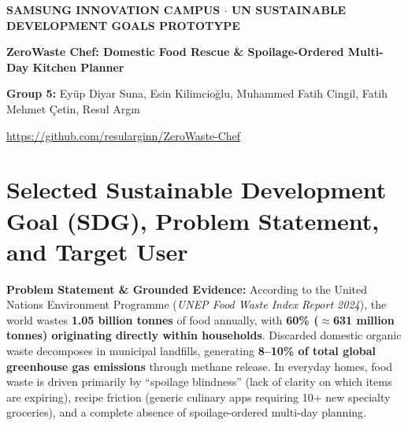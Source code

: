 \documentclass[9pt,a4paper]{article}
\begin{document}
\begin{tcolorbox}[
  enhanced,
  colback=undpblue,
  colframe=undpblue,
  arc=5pt,
  boxrule=0pt,
  left=8pt, right=8pt, top=5pt, bottom=5pt
]
  \begin{minipage}[c]{0.72\textwidth}
    {\fontsize{7.2}{8.8}\selectfont\bfseries\color{white!85!yellow} SAMSUNG INNOVATION CAMPUS $\cdot$ UN SUSTAINABLE DEVELOPMENT GOALS PROTOTYPE\par}\vspace{2pt}
    {\fontsize{13}{15.5}\selectfont\bfseries\color{white} ZeroWaste Chef: Domestic Food Rescue \& Spoilage-Ordered Multi-Day Kitchen Planner\par}\vspace{2.5pt}
    {\fontsize{7.8}{9.5}\selectfont\color{white!92} \textbf{Group 5:} Eyüp Diyar Suna, Esin Kilimcioğlu, Muhammed Fatih Cingil, Fatih Mehmet Çetin, Resul Argın\par}
  \end{minipage}%
  \hfill
  \begin{minipage}[c]{0.26\textwidth}
    \raggedleft
    \leavevmode{}\par\vspace{1.5pt}
    \leavevmode{}\par\vspace{1.5pt}
    {\fontsize{6.8}{8}\selectfont\color{white!90} \url{https://github.com/resularginn/ZeroWaste-Chef}\par}
  \end{minipage}
\end{tcolorbox}
\vspace{-5pt}

\section{Selected Sustainable Development Goal (SDG), Problem Statement, and Target User}
\textbf{Problem Statement \& Grounded Evidence:} According to the United Nations Environment Programme (\emph{UNEP Food Waste Index Report 2024}), the world wastes \textbf{1.05 billion tonnes} of food annually, with \textbf{60\% ($\approx$631 million tonnes) originating directly within households}. Discarded domestic organic waste decomposes in municipal landfills, generating \textbf{8--10\% of total global greenhouse gas emissions} through methane release. In everyday homes, food waste is driven primarily by ``spoilage blindness'' (lack of clarity on which items are expiring), recipe friction (generic culinary apps requiring 10+ new specialty groceries), and a complete absence of spoilage-ordered multi-day planning.
\end{document}
